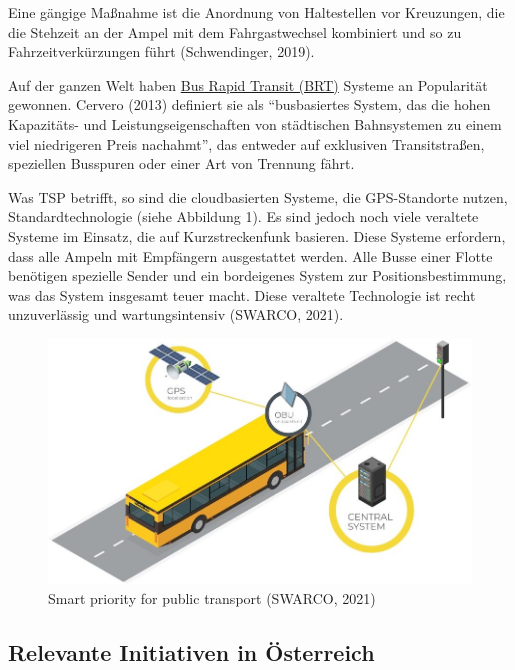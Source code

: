 \documentclass[
]{book}
\begin{document}
Eine gängige Maßnahme ist die Anordnung von Haltestellen vor Kreuzungen, die die Stehzeit an der Ampel mit dem Fahrgastwechsel kombiniert und so zu Fahrzeitverkürzungen führt (Schwendinger, 2019).

Auf der ganzen Welt haben \protect\hyperlink{brt}{Bus Rapid Transit (BRT)} Systeme an Popularität gewonnen. Cervero (2013) definiert sie als ``busbasiertes System, das die hohen Kapazitäts- und Leistungseigenschaften von städtischen Bahnsystemen zu einem viel niedrigeren Preis nachahmt'', das entweder auf exklusiven Transitstraßen, speziellen Busspuren oder einer Art von Trennung fährt.

Was TSP betrifft, so sind die cloudbasierten Systeme, die GPS-Standorte nutzen, Standardtechnologie (siehe Abbildung 1). Es sind jedoch noch viele veraltete Systeme im Einsatz, die auf Kurzstreckenfunk basieren. Diese Systeme erfordern, dass alle Ampeln mit Empfängern ausgestattet werden. Alle Busse einer Flotte benötigen spezielle Sender und ein bordeigenes System zur Positionsbestimmung, was das System insgesamt teuer macht. Diese veraltete Technologie ist recht unzuverlässig und wartungsintensiv (SWARCO, 2021).

\begin{figure}
\includegraphics[width=0.7\linewidth]{image/pt_priority_system} \caption{Smart priority for public transport (SWARCO, 2021)}\label{fig:unnamed-chunk-10}
\end{figure}

\hypertarget{relevante-initiativen-in-uxf6sterreich-5}{%
\subsection*{Relevante Initiativen in Österreich}\label{relevante-initiativen-in-uxf6sterreich-5}}
\end{document}

